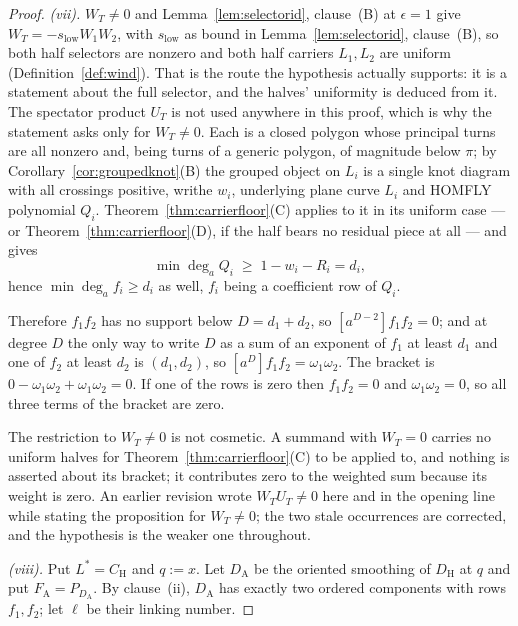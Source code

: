 \begin{proof}
\emph{(vii).} $W_T\neq0$ and Lemma~\ref{lem:selectorid}, clause~(B) at $\epsilon=1$ give
$W_T=-s_{\mathrm{low}}W_1W_2$, with $s_{\mathrm{low}}$ as bound in
Lemma~\ref{lem:selectorid}, clause~(B), so both half selectors are nonzero and both half
carriers $L_1,L_2$ are uniform (Definition~\ref{def:wind}). That is the route
the hypothesis actually supports: it is a statement about the full selector, and
the halves' uniformity is deduced from it. The spectator product $U_T$ is not
used anywhere in this proof, which is why the statement asks only for
$W_T\neq0$. Each is a closed polygon whose principal turns are all
nonzero and, being turns of a generic polygon, of magnitude below $\pi$; by
Corollary~\ref{cor:groupedknot}(B) the grouped object on $L_i$ is a single knot
diagram with all crossings positive, writhe $w_i$, underlying plane curve
$L_i$ and HOMFLY polynomial $Q_i$. Theorem~\ref{thm:carrierfloor}(C) applies to it
in its uniform case --- or Theorem~\ref{thm:carrierfloor}(D), if the half bears no
residual piece at all --- and gives
\[
   \min\deg_a Q_i\;\geq\;1-w_i-R_i=d_i,
\]
hence $\min\deg_af_i\geq d_i$ as well, $f_i$ being a coefficient row of $Q_i$.

Therefore $f_1f_2$ has no support below $D=d_1+d_2$, so
$[a^{D-2}]f_1f_2=0$; and at degree $D$ the only way to write $D$ as a sum of an
exponent of $f_1$ at least $d_1$ and one of $f_2$ at least $d_2$ is
$(d_1,d_2)$, so $[a^{D}]f_1f_2=\omega_1\omega_2$. The bracket is
$0-\omega_1\omega_2+\omega_1\omega_2=0$. If one of the rows is zero then $f_1f_2=0$ and $\omega_1\omega_2=0$, so all
three terms of the bracket are zero.

The restriction to $W_T\neq0$ is not cosmetic. A summand with $W_T=0$ carries no
uniform halves for Theorem~\ref{thm:carrierfloor}(C) to be applied to, and nothing
is asserted about its bracket; it contributes zero to the weighted sum because
its weight is zero. An earlier revision wrote $W_TU_T\neq0$ here and in the
opening line while stating the proposition for $W_T\neq0$; the two stale
occurrences are corrected, and the hypothesis is the weaker one throughout.

\emph{(viii).} Put $L^*=C_{\mathrm H}$ and $q:=x$. Let $D_{\mathrm A}$ be the oriented
smoothing of $D_{\mathrm H}$ at $q$ and put $F_{\mathrm A}=P_{D_{\mathrm A}}$.
By clause~(ii), $D_{\mathrm A}$ has exactly two ordered
components with rows $f_1,f_2$; let $\ell$ be their linking number.


\end{proof}
